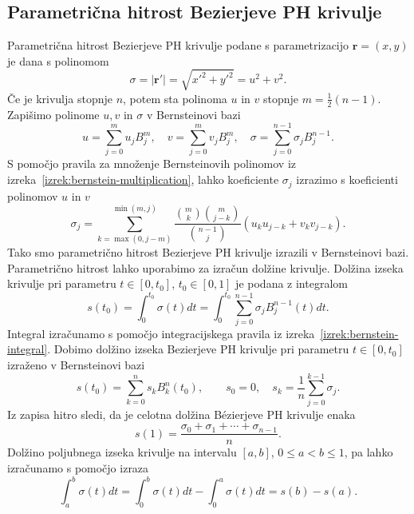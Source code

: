 \documentclass[isrm2, tisk]{fmfdelo}
\newcommand{\mycomment}[1]{\textbf{\textcolor{red}{#1}}}
\begin{document}
%
%
%
%

    \subsection{Parametrična hitrost Bezierjeve PH krivulje}
    Parametrična hitrost Bezierjeve PH krivulje podane s parametrizacijo $\mathbf{r}=(x,y)$ je dana s polinomom
    \[\sigma = |\mathbf{r}'| = \sqrt{x'^2+y'^2} = u^2+v^2.\]
    Če je krivulja stopnje $n$, potem sta polinoma $u$ in $v$ stopnje $m=\frac{1}{2}(n-1)$.
    Zapišimo polinome $u,v$ in $\sigma$ v Bernsteinovi bazi \[u=\sum_{j=0}^{m}u_j B_{j}^{m}, \quad v=\sum_{j=0}^{m}v_j B_{j}^{m}, \quad \sigma=\sum_{j=0}^{n-1}\sigma_j B_j^{n-1}.\]
    S pomočjo pravila za množenje Bernsteinovih polinomov iz izreka~\ref{izrek:bernstein-multiplication}, lahko koeficiente $\sigma_j$ izrazimo s koeficienti polinomov $u$ in $v$
    \[\sigma_j = \sum_{k=\max(0,j-m)}^{\min(m,j)} \frac{\binom{m}{k}\binom{m}{j-k}}{\binom{n-1}{j}}(u_k u_{j-k}+v_k v_{j-k}).\]
    Tako smo parametrično hitrost Bezierjeve PH krivulje izrazili v Bernsteinovi bazi.
    Parametrično hitrost lahko uporabimo za izračun dolžine krivulje.
    Dolžina izseka krivulje pri parametru $t \in [0,t_0]$, $t_0\in[0,1]$ je podana z integralom
    \[s(t_0)=\int_0^{t_0}\sigma(t)dt = \int_0^{t_0}\sum_{j=0}^{n-1}\sigma_j B_j^{n-1}(t)dt.\]
    Integral izračunamo s pomočjo integracijskega pravila iz izreka~\ref{izrek:bernstein-integral}.
    Dobimo dolžino izseka Bezierjeve PH krivulje pri parametru $t \in [0,t_0]$ izraženo v Bernsteinovi bazi
    \[s(t_0)=\sum_{k=0}^n s_k B_k^{n}(t_0),\qquad s_0=0,\quad s_k = \frac{1}{n}\sum^{k-1}_{j=0}\sigma_j.\]
    Iz zapisa hitro sledi, da je celotna dolžina Bézierjeve PH krivulje enaka \[s(1)=\frac{\sigma_0+\sigma_1+\cdots+\sigma_{n-1}}{n}.\]
    Dolžino poljubnega izseka krivulje na intervalu $[a,b]$, $0\leq a < b\leq1$, pa lahko izračunamo s pomočjo izraza
    \[\int_a^b \sigma(t)dt = \int_0^b\sigma(t)dt - \int_0^a\sigma(t)dt = s(b)-s(a).\]
\end{document}
